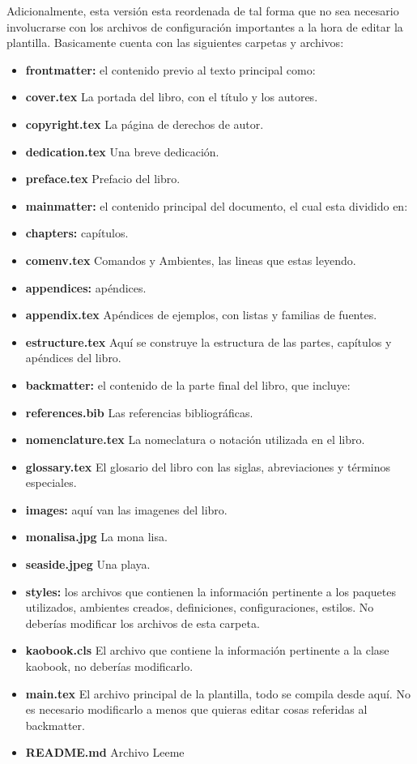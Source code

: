 Adicionalmente, esta versión esta reordenada de tal forma que no sea necesario involucrarse con los archivos de configuración importantes a la hora de editar la plantilla. Basicamente cuenta con las siguientes carpetas y archivos:
\begin{itemize}
    \item \textbf{frontmatter:} el contenido previo al texto principal como:
        \item \textbf{cover.tex} La portada del libro, con el título y los autores.
        \item \textbf{copyright.tex} La página de derechos de autor.
        \item \textbf{dedication.tex} Una breve dedicación.
        \item \textbf{preface.tex} Prefacio del libro.
    \item \textbf{mainmatter:} el contenido principal del documento, el cual esta dividido en:
        \item \textbf{chapters:} capítulos.
            \item \textbf{comenv.tex} Comandos y Ambientes, las lineas que estas leyendo.
        \item \textbf{appendices:} apéndices.
            \item \textbf{appendix.tex} Apéndices de ejemplos, con listas y familias de fuentes.
        \item \textbf{estructure.tex} Aquí se construye la estructura de las partes, capítulos y apéndices del libro.
    \item \textbf{backmatter:} el contenido de la parte final del libro, que incluye:
        \item \textbf{references.bib} Las referencias bibliográficas.
        \item \textbf{nomenclature.tex} La nomeclatura o notación utilizada en el libro.
        \item \textbf{glossary.tex} El glosario del libro con las siglas, abreviaciones y términos especiales.
    \item \textbf{images:} aquí van las imagenes del libro.
        \item \textbf{monalisa.jpg} La mona lisa.
        \item \textbf{seaside.jpeg} Una playa. 
    \item \textbf{styles:} los archivos que contienen la información pertinente a los paquetes utilizados, ambientes creados, definiciones, configuraciones, estilos. No deberías modificar los archivos de esta carpeta.
    \item \textbf{kaobook.cls} El archivo que contiene la información pertinente a la clase kaobook, no deberías modificarlo.
    \item \textbf{main.tex} El archivo principal de la plantilla, todo se compila desde aquí. No es necesario modificarlo a menos que quieras editar cosas referidas al backmatter.
    \item \textbf{README.md} Archivo Leeme
\end{itemize}

